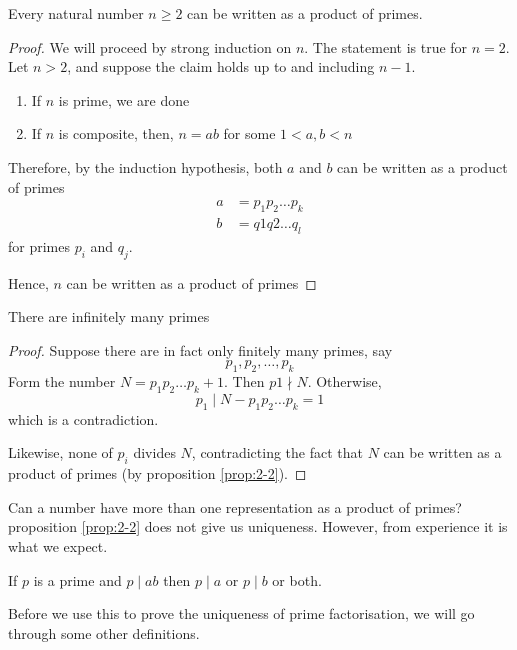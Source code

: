\documentclass{article}
\begin{document}
\begin{nprop}\label{prop:2-2}
    Every natural number $n \geq 2$ can be written as a product of primes.
\end{nprop}

\begin{proof}
    We will proceed by strong induction on $n$. The statement is true for $n=2$. Let $n > 2$, and suppose the claim holds up to and including $n-1$.
    \begin{enumerate}[cases]
        \item If $n$ is prime, we are done
        \item If $n$ is composite, then, $n = ab$ for some $1 < a, b < n$
    \end{enumerate}
    Therefore, by the induction hypothesis, both $a$ and $b$ can be written as a product of primes
    \begin{align*}
        a &= p_1p_2 \ldots p_k \\
        b &= q1q2 \ldots q_l
    \end{align*}
    for primes $p_i$ and $q_j$.

    Hence, $n$ can be written as a product of primes
\end{proof}

\begin{nthm}
    There are infinitely many primes
\end{nthm}
\begin{proof}
    Suppose there are in fact only finitely many primes, say
    \[
        p_1, p_2, \ldots, p_k  
    \]
    Form the number $N = p_1p_2\ldots p_k + 1$. Then $p1 \nmid N$. Otherwise,
    \[
        p_1 \mid N - p_1p_2 \ldots p_k = 1
    \]
    which is a contradiction. \contradiction

    Likewise, none of $p_i$ divides $N$, contradicting the fact that $N$ can be written as a product of primes (by proposition \ref{prop:2-2}). \contradiction
\end{proof}

Can a number have more than one representation as a product of primes? proposition \ref{prop:2-2} does not give us uniqueness. However, from experience it is what we expect.

\begin{nprop}\label{prop:2-4}
    If $p$ is a prime and $p \mid ab$ then $p \mid a$ or $p \mid b$ or both.
\end{nprop}

Before we use this to prove the uniqueness of prime factorisation, we will go through some other definitions.
\end{document}
